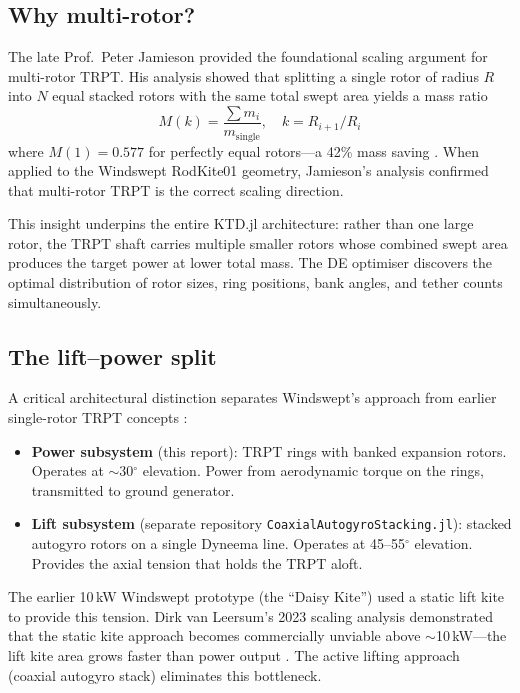 \documentclass[11pt,a4paper]{article}
\begin{document}
\subsection{Why multi-rotor?}

The late Prof.\ Peter Jamieson provided the foundational scaling argument for multi-rotor TRPT.
His analysis showed that splitting a single rotor of radius $R$ into $N$ equal stacked rotors with the same total swept area yields a mass ratio
\begin{equation}
M(k) = \frac{\sum m_i}{m_{\text{single}}}, \quad k = R_{i+1}/R_i
\end{equation}
where $M(1) = 0.577$ for perfectly equal rotors---a 42\% mass saving \cite{jamieson2020}.
When applied to the Windswept RodKite01 geometry, Jamieson's analysis confirmed that multi-rotor TRPT is the correct scaling direction.

This insight underpins the entire KTD.jl architecture: rather than one large rotor, the TRPT shaft carries multiple smaller rotors whose combined swept area produces the target power at lower total mass.
The DE optimiser discovers the optimal distribution of rotor sizes, ring positions, bank angles, and tether counts simultaneously.

\subsection{The lift--power split}

A critical architectural distinction separates Windswept's approach from earlier single-rotor TRPT concepts \cite{tulloch2021}:

\begin{itemize}
\item \textbf{Power subsystem} (this report): TRPT rings with banked expansion rotors.
Operates at $\sim$30$^\circ$ elevation.
Power from aerodynamic torque on the rings, transmitted to ground generator.
\item \textbf{Lift subsystem} (separate repository \texttt{CoaxialAutogyroStacking.jl}): stacked autogyro rotors on a single Dyneema line.
Operates at 45--55$^\circ$ elevation.
Provides the axial tension that holds the TRPT aloft.
\end{itemize}

The earlier 10\,kW Windswept prototype (the ``Daisy Kite'') used a static lift kite to provide this tension.
Dirk van Leersum's 2023 scaling analysis demonstrated that the static kite approach becomes commercially unviable above $\sim$10\,kW---the lift kite area grows faster than power output \cite{vanleersum2023}.
The active lifting approach (coaxial autogyro stack) eliminates this bottleneck.
\end{document}
